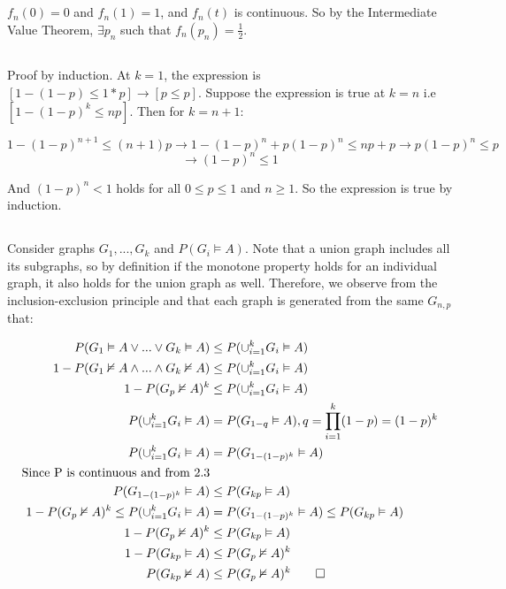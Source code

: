\documentclass{article}
\begin{document}
\subsection{}
$f_n(0) = 0$ and $f_n(1) = 1$, and $f_n(t)$ is continuous. So by the Intermediate Value Theorem, $\exists p_n$ such that $f_n(p_n) = \frac{1}{2}$.

\subsection{}
Proof by induction. At $k = 1$, the expression is $[1-(1-p) \le 1*p] \rightarrow [p \le p]$. Suppose the expression is true at $k = n$ i.e $[1-(1-p)^k \le np]$. Then for $k = n+1$:

$$1-(1-p)^{n+1} \le (n+1)p \rightarrow 1 - (1-p)^n + p(1-p)^n \le np + p \rightarrow p(1-p)^n \le p $$ 
$$\rightarrow (1-p)^n \le 1$$

And $(1-p)^n < 1$ holds for all $0 \le p \le 1$ and $n \ge 1$. So the expression is true by induction.

\subsection{}
Consider graphs $G_1,...,G_k$ and $P(G_i\vDash A)$. Note that a union graph includes all its subgraphs, so by definition if the monotone property holds for an individual graph, it also holds for the union graph as well. Therefore, we observe from the inclusion-exclusion principle and that each graph is generated from the same $G_{n,p}$ that:

\begin{align*}
P(G_1\vDash A \vee ... \vee G_k\vDash A)&\le P(\cup_{i=1}^k G_i\vDash A)\\
1-P(G_1\nvDash A \wedge ... \wedge G_k\nvDash A)&\le P(\cup_{i=1}^k G_i\vDash A)\\
1-P(G_p\nvDash A)^k&\le P(\cup_{i=1}^k G_i\vDash A)\\
P(\cup_{i=1}^kG_i\vDash A)&=P(G_{1-q}\vDash A), q=\prod_{i=1}^k(1-p)=(1-p)^k\\
P(\cup_{i=1}^kG_i\vDash A)&=P(G_{1-(1-p)^k}\vDash A)\\
\text{Since P is continuous and from 2.3}\\
P(G_{1-(1-p)^k}\vDash A)&\le P(G_{kp}\vDash A)\\
1-P(G_p\nvDash A)^k\le P(\cup_{i=1}^k G_i\vDash A)&=P(G_{1-(1-p)^k}\vDash A)\le P(G_{kp}\vDash A)\\
1-P(G_p\nvDash A)^k&\le P(G_{kp}\vDash A)\\
1-P(G_{kp}\vDash A)&\le P(G_p\nvDash A)^k\\
P(G_{kp}\nvDash A)&\le P(G_p\nvDash A)^k\qed \\
\end{align*}
\end{document}
